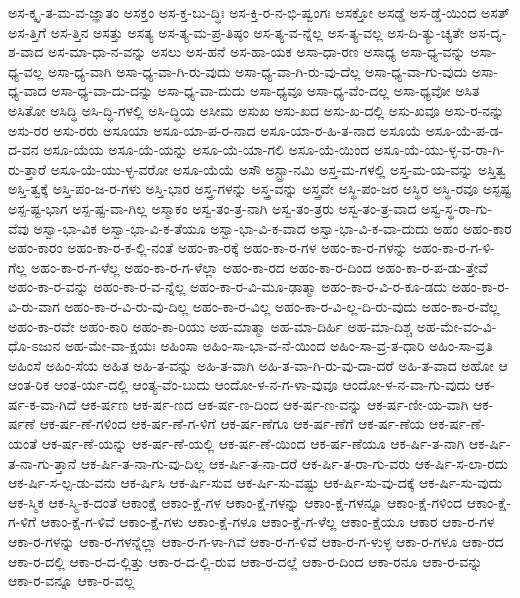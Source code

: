 {ಅಸ-ಕ್ಕೃ-ತ-ಮ-ವ-ಜ್ಞಾತಂ
ಅಸಕ್ತಂ
ಅಸ-ಕ್ತ-ಬು-ದ್ಧಿಃ
ಅಸ-ಕ್ತಿ-ರ-ನ-ಭಿ-ಷ್ವಂಗಃ
ಅಸಕ್ತೋ
ಅಸಡ್ಡೆ
ಅಸ-ಡ್ಡೆ-ಯಿಂದ
ಅಸತ್
ಅಸ-ತ್ತಿಗೆ
ಅಸ-ತ್ತಿನ
ಅಸತ್ತು
ಅಸತ್ಯ
ಅಸ-ತ್ಯ-ಮ-ಪ್ರ-ತಿಷ್ಠಂ
ಅಸ-ತ್ಯ-ವ-ನ್ನೆಲ್ಲ
ಅಸ-ತ್ಯ-ವಲ್ಲ
ಅಸ-ದಿ-ತ್ಯು-ಚ್ಯತೇ
ಅಸ-ದೃ-ಶ-ವಾದ
ಅಸ-ಮಾ-ಧಾ-ನ-ವನ್ನು
ಅಸಲು
ಅಸ-ಹನೆ
ಅಸ-ಹಾ-ಯಕ
ಅಸಾ-ಧಾ-ರಣ
ಅಸಾಧ್ಯ
ಅಸಾ-ಧ್ಯ-ವನ್ನು
ಅಸಾ-ಧ್ಯ-ವಲ್ಲ
ಅಸಾ-ಧ್ಯ-ವಾಗಿ
ಅಸಾ-ಧ್ಯ-ವಾ-ಗಿ-ರು-ವುದು
ಅಸಾ-ಧ್ಯ-ವಾ-ಗಿ-ರು-ವು-ದೆಲ್ಲ
ಅಸಾ-ಧ್ಯ-ವಾ-ಗು-ವುದು
ಅಸಾ-ಧ್ಯ-ವಾದ
ಅಸಾ-ಧ್ಯ-ವಾ-ದು-ದನ್ನು
ಅಸಾ-ಧ್ಯ-ವಾ-ದುದು
ಅಸಾ-ಧ್ಯವೂ
ಅಸಾ-ಧ್ಯ-ವೆಂ-ದಲ್ಲ
ಅಸಾ-ಧ್ಯವೋ
ಅಸಿತ
ಅಸಿತೋ
ಅಸಿದ್ಧಿ
ಅಸಿ-ದ್ಧಿ-ಗಳಲ್ಲಿ
ಅಸಿ-ದ್ಧಿಯ
ಅಸೀಮ
ಅಸುಖ
ಅಸು-ಖದ
ಅಸು-ಖ-ದಲ್ಲಿ
ಅಸು-ಖವೂ
ಅಸು-ರ-ನನ್ನು
ಅಸು-ರರ
ಅಸು-ರರು
ಅಸೂಯಾ
ಅಸೂ-ಯಾ-ಪ-ರ-ನಾದ
ಅಸೂ-ಯಾ-ರ-ಹಿ-ತ-ನಾದ
ಅಸೂಯೆ
ಅಸೂ-ಯೆ-ಪ-ಡ-ದ-ವನ
ಅಸೂ-ಯೆಯ
ಅಸೂ-ಯೆ-ಯನ್ನು
ಅಸೂ-ಯೆ-ಯಾ-ಗಲಿ
ಅಸೂ-ಯೆ-ಯಿಂದ
ಅಸೂ-ಯೆ-ಯು-ಳ್ಳ-ವ-ರಾ-ಗಿ-ರು-ತ್ತಾರೆ
ಅಸೂ-ಯೆ-ಯು-ಳ್ಳ-ವರೋ
ಅಸೂ-ಯೆಯೆ
ಅಸೌ
ಅಸ್ಟ್ರಾ-ನಮಿ
ಅಸ್ತ-ಮ-ಗಳಲ್ಲಿ
ಅಸ್ತ-ಮ-ಯ-ವನ್ನು
ಅಸ್ತಿತ್ವ
ಅಸ್ತಿ-ತ್ವಕ್ಕೆ
ಅಸ್ತಿ-ಪಂ-ಜ-ರ-ಗಳು
ಅಸ್ತಿ-ಭಾರ
ಅಸ್ತ್ರ-ಗಳನ್ನು
ಅಸ್ತ್ರ-ವನ್ನು
ಅಸ್ತ್ರವೇ
ಅಸ್ಥಿ-ಪಂ-ಜರ
ಅಸ್ಥಿರ
ಅಸ್ಥಿ-ರವೂ
ಅಸ್ಪಷ್ಟ
ಅಸ್ಪ-ಷ್ಟ-ಭಾಗ
ಅಸ್ಪ-ಷ್ಟ-ವಾ-ಗಿಲ್ಲ
ಅಸ್ಮಾಕಂ
ಅಸ್ವ-ತಂ-ತ್ರ-ನಾಗಿ
ಅಸ್ವ-ತಂ-ತ್ರರು
ಅಸ್ವ-ತಂ-ತ್ರ-ವಾದ
ಅಸ್ವ-ಸ್ಥ-ರಾ-ಗು-ವೆವು
ಅಸ್ವಾ-ಭಾ-ವಿಕ
ಅಸ್ವಾ-ಭಾ-ವಿ-ಕ-ತೆಯೂ
ಅಸ್ವಾ-ಭಾ-ವಿ-ಕ-ವಾದ
ಅಸ್ವಾ-ಭಾ-ವಿ-ಕ-ವಾ-ದುದು
ಅಹಂ
ಅಹಂ-ಕಾರ
ಅಹಂ-ಕಾರಂ
ಅಹಂ-ಕಾ-ರ-ಕ-ಲ್ಲಿ-ನಂತೆ
ಅಹಂ-ಕಾ-ರಕ್ಕೆ
ಅಹಂ-ಕಾ-ರ-ಗಳ
ಅಹಂ-ಕಾ-ರ-ಗಳನ್ನು
ಅಹಂ-ಕಾ-ರ-ಗ-ಳಿ-ಗೆಲ್ಲ
ಅಹಂ-ಕಾ-ರ-ಗ-ಳೆಲ್ಲ
ಅಹಂ-ಕಾ-ರ-ಗ-ಳೆಲ್ಲಾ
ಅಹಂ-ಕಾ-ರದ
ಅಹಂ-ಕಾ-ರ-ದಿಂದ
ಅಹಂ-ಕಾ-ರ-ಪ-ಡು-ತ್ತೇವೆ
ಅಹಂ-ಕಾ-ರ-ವನ್ನು
ಅಹಂ-ಕಾ-ರ-ವ-ನ್ನೆಲ್ಲ
ಅಹಂ-ಕಾ-ರ-ವಿ-ಮೂ-ಢಾತ್ಮಾ
ಅಹಂ-ಕಾ-ರ-ವಿ-ರ-ಕೂ-ಡದು
ಅಹಂ-ಕಾ-ರ-ವಿ-ರು-ವಾಗ
ಅಹಂ-ಕಾ-ರ-ವಿ-ರು-ವು-ದಿಲ್ಲ
ಅಹಂ-ಕಾ-ರ-ವಿಲ್ಲ
ಅಹಂ-ಕಾ-ರ-ವಿ-ಲ್ಲ-ದಿ-ರು-ವುದು
ಅಹಂ-ಕಾ-ರ-ವೆಲ್ಲ
ಅಹಂ-ಕಾ-ರವೇ
ಅಹಂ-ಕಾರಿ
ಅಹಂ-ಕಾ-ರಿಯು
ಅಹ-ಮಾತ್ಮಾ
ಅಹ-ಮಾ-ದಿರ್ಹಿ
ಅಹ-ಮಾ-ದಿಶ್ಚ
ಅಹ-ಮೇ-ವಂ-ವಿ-ಧೊ-ಽಜುನ
ಅಹ-ಮೇ-ವಾ-ಕ್ಷಯಃ
ಅಹಿಂಸಾ
ಅಹಿಂ-ಸಾ-ಭಾ-ವ-ನೆ-ಯಿಂದ
ಅಹಿಂ-ಸಾ-ವ್ರ-ತ-ಧಾರಿ
ಅಹಿಂ-ಸಾ-ವ್ರತಿ
ಅಹಿಂಸೆ
ಅಹಿಂ-ಸೆಯ
ಅಹಿತ
ಅಹಿ-ತ-ವನ್ನು
ಅಹಿ-ತ-ವಾಗಿ
ಅಹಿ-ತ-ವಾ-ಗಿ-ರು-ವು-ದಾ-ದರೆ
ಅಹಿ-ತ-ವಾದ
ಅಹೋ
ಆ
ಆಂತ-ರಿಕ
ಆಂತ-ರ್ಯ-ದಲ್ಲಿ
ಆಂತ್ಯ-ವೆಂ-ಬುದು
ಆಂದೋ-ಳ-ನ-ಗ-ಳಾ-ವುವೂ
ಆಂದೋ-ಳ-ನ-ವಾ-ಗು-ವುದು
ಆಕ-ರ್ಷ-ಕ-ವಾ-ಗಿದೆ
ಆಕ-ರ್ಷಣ
ಆಕ-ರ್ಷ-ಣದ
ಆಕ-ರ್ಷ-ಣ-ದಿಂದ
ಆಕ-ರ್ಷ-ಣ-ವನ್ನು
ಆಕ-ರ್ಷ-ಣೀ-ಯ-ವಾಗಿ
ಆಕ-ರ್ಷಣೆ
ಆಕ-ರ್ಷ-ಣೆ-ಗಳಿಂದ
ಆಕ-ರ್ಷ-ಣೆ-ಗ-ಳಿಗೆ
ಆಕ-ರ್ಷ-ಣೆಗೂ
ಆಕ-ರ್ಷ-ಣೆಗೆ
ಆಕ-ರ್ಷ-ಣೆಯ
ಆಕ-ರ್ಷ-ಣೆ-ಯಂತೆ
ಆಕ-ರ್ಷ-ಣೆ-ಯನ್ನು
ಆಕ-ರ್ಷ-ಣೆ-ಯಲ್ಲಿ
ಆಕ-ರ್ಷ-ಣೆ-ಯಿಂದ
ಆಕ-ರ್ಷ-ಣೆಯೂ
ಆಕ-ರ್ಷಿ-ತ-ನಾಗಿ
ಆಕ-ರ್ಷಿ-ತ-ನಾ-ಗು-ತ್ತಾನೆ
ಆಕ-ರ್ಷಿ-ತ-ನಾ-ಗು-ವು-ದಿಲ್ಲ
ಆಕ-ರ್ಷಿ-ತ-ನಾ-ದರೆ
ಆಕ-ರ್ಷಿ-ತ-ರಾ-ಗು-ವರು
ಆಕ-ರ್ಷಿ-ಸ-ಲಾ-ರದು
ಆಕ-ರ್ಷಿ-ಸ-ಲ್ಪ-ಡು-ವನು
ಆಕ-ರ್ಷಿಸಿ
ಆಕ-ರ್ಷಿ-ಸುವ
ಆಕ-ರ್ಷಿ-ಸು-ವಷ್ಟು
ಆಕ-ರ್ಷಿ-ಸು-ವು-ದಕ್ಕೆ
ಆಕ-ರ್ಷಿ-ಸು-ವುದು
ಆಕ-ಸ್ಮಿಕ
ಆಕ-ಸ್ಮಿ-ಕ-ದಂತೆ
ಆಕಾಂಕ್ಷೆ
ಆಕಾಂ-ಕ್ಷೆ-ಗಳ
ಆಕಾಂ-ಕ್ಷೆ-ಗಳನ್ನು
ಆಕಾಂ-ಕ್ಷೆ-ಗಳನ್ನೂ
ಆಕಾಂ-ಕ್ಷೆ-ಗಳಿಂದ
ಆಕಾಂ-ಕ್ಷೆ-ಗ-ಳಿಗೆ
ಆಕಾಂ-ಕ್ಷೆ-ಗ-ಳಿವೆ
ಆಕಾಂ-ಕ್ಷೆ-ಗಳು
ಆಕಾಂ-ಕ್ಷೆ-ಗಳೂ
ಆಕಾಂ-ಕ್ಷೆ-ಗ-ಳೆಲ್ಲ
ಆಕಾಂ-ಕ್ಷೆಯೂ
ಆಕಾರ
ಆಕಾ-ರ-ಗಳ
ಆಕಾ-ರ-ಗಳನ್ನು
ಆಕಾ-ರ-ಗಳನ್ನೆಲ್ಲಾ
ಆಕಾ-ರ-ಗ-ಳಾ-ಗಿವೆ
ಆಕಾ-ರ-ಗ-ಳಿವೆ
ಆಕಾ-ರ-ಗ-ಳುಳ್ಳ
ಆಕಾ-ರ-ಗಳೂ
ಆಕಾ-ರದ
ಆಕಾ-ರ-ದಲ್ಲಿ
ಆಕಾ-ರ-ದ-ಲ್ಲಿತ್ತು
ಆಕಾ-ರ-ದ-ಲ್ಲಿ-ರುವ
ಆಕಾ-ರ-ದಲ್ಲೆ
ಆಕಾ-ರ-ದಿಂದ
ಆಕಾ-ರನೂ
ಆಕಾ-ರ-ವನ್ನು
ಆಕಾ-ರ-ವನ್ನೂ
ಆಕಾ-ರ-ವಲ್ಲ
}
